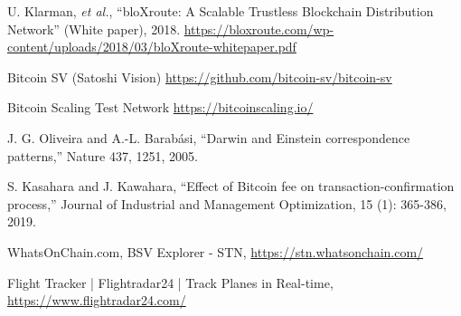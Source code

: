 \documentclass[graybox]{svmult}
\begin{document}
\begin{thebibliography}{99}
  U. Klarman, \textit{et al.},
  ``bloXroute: A Scalable Trustless Blockchain Distribution Network''
  (White paper), 2018.
  \url{https://bloxroute.com/wp-content/uploads/2018/03/bloXroute-whitepaper.pdf}


  Bitcoin SV (Satoshi Vision) 
  \url{https://github.com/bitcoin-sv/bitcoin-sv}

  Bitcoin Scaling Test Network
  \url{https://bitcoinscaling.io/}




  J. G. Oliveira and A.-L. Barab\'asi,
  ``Darwin and Einstein correspondence patterns,'' 
  Nature 437, 1251, 2005.


  S. Kasahara and J. Kawahara,
  ``Effect of Bitcoin fee on transaction-confirmation process,''
  Journal of Industrial and Management Optimization, 15 (1): 365-386, 2019.


  WhatsOnChain.com, BSV Explorer - STN,
  \url{https://stn.whatsonchain.com/}



  Flight Tracker | Flightradar24 | Track Planes in Real-time,
  \url{https://www.flightradar24.com/}



\end{thebibliography}
\end{document}
